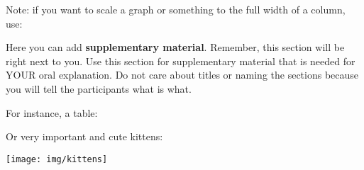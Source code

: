 \documentclass[a0paper,fleqn]{betterposter}
\begin{document}
{\vspace*{3.0em}

Note: if you want to scale a graph or something to the full width of a column, use:

\vspace*{1.0em}


}{

Here you can add \textbf{supplementary material}. Remember, this section will be
right next to you.
Use this section for supplementary material that is needed for YOUR oral
explanation. Do not care about titles or naming the sections because you will
tell the participants what is what.

\vspace*{3.0em}

For instance, a table:


\vspace*{3.0em}

Or very important and cute kittens:
\begin{center}
\texttt{[image: img/kittens]}
\end{center}

}
\end{document}
